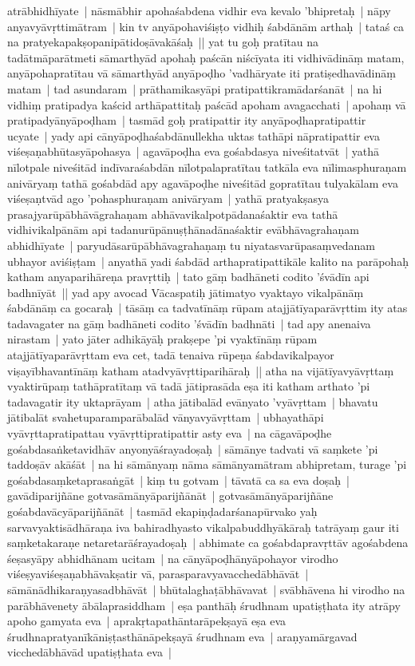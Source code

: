 \documentclass[article,12pt,a4paper]{memoir}%
\begin{document}
	  
	  \pstart \leavevmode%
	\label{thakur75-59.4}atrābhidhīyate | nāsmābhir apohaśabdena vidhir eva kevalo 'bhipretaḥ | nāpy anyavyāvṛttimātram | kin tv anyāpohaviśiṣṭo vidhiḥ śabdānām arthaḥ | tataś ca na pratyekapakṣopanipātidoṣāvakāśaḥ || \label{thakur75-59.7} yat tu goḥ pratītau na tadātmāparātmeti sāmarthyād apohaḥ paścān niścīyata iti vidhivādināṃ matam, anyāpohapratītau vā sāmarthyād anyāpoḍho 'vadhāryate iti pratiṣedhavādināṃ matam | tad asundaram | prāthamikasyāpi pratipattikramādarśanāt | na hi vidhiṃ pratipadya kaścid arthāpattitaḥ paścād apoham avagacchati | apohaṃ vā pratipadyānyāpoḍham | tasmād goḥ pratipattir ity anyāpoḍhapratipattir ucyate | yady api cānyāpoḍhaśabdānullekha uktas tathāpi nāpratipattir eva viśeṣaṇabhūtasyāpohasya | agavāpoḍha eva gośabdasya niveśitatvāt | yathā nīlotpale niveśitād indīvaraśabdān nīlotpalapratītau tatkāla eva nīlimasphuraṇam anivāryaṃ tathā gośabdād apy agavāpoḍhe niveśitād gopratītau tulyakālam eva viśeṣaṇtvād ago 'pohasphuraṇam anivāryam | yathā pratyakṣasya prasajyarūpābhāvāgrahaṇam abhāvavikalpotpādanaśaktir eva tathā vidhivikalpānām api tadanurūpānuṣṭhānadānaśaktir evābhāvagrahaṇam abhidhīyate | paryudāsarūpābhāvagrahaṇaṃ tu niyatasvarūpasaṃvedanam ubhayor aviśiṣṭam | anyathā yadi śabdād arthapratipattikāle kalito na parāpohaḥ katham anyaparihāreṇa pravṛttiḥ | tato gāṃ badhāneti codito 'śvādīn api badhnīyāt || \label{thakur75-59.21} yad apy avocad Vācaspatiḥ jātimatyo vyaktayo vikalpānāṃ śabdānāṃ ca gocaraḥ | tāsāṃ ca tadvatīnāṃ rūpam atajjātīyaparāvṛttim ity atas tadavagater na gāṃ badhāneti codito 'śvādīn badhnāti | tad apy anenaiva nirastam | yato jāter adhikāyāḥ prakṣepe 'pi vyaktīnāṃ rūpam atajjātīyaparāvṛttam eva cet, tadā tenaiva rūpeṇa śabdavikalpayor viṣayībhavantīnāṃ katham atadvyāvṛttiparihāraḥ || \label{thakur75-59.26} atha na vijātīyavyāvṛttaṃ vyaktirūpaṃ tathāpratītaṃ vā tadā jātiprasāda eṣa iti katham arthato 'pi tadavagatir ity uktaprāyam | \label{thakur75-59.28} atha jātibalād evānyato 'vyāvṛttam | bhavatu jātibalāt svahetuparamparābalād vānyavyāvṛttam | ubhayathāpi vyāvṛttapratipattau vyāvṛttipratipattir asty eva | \label{thakur75-60.1} na cāgavāpoḍhe gośabdasaṅketavidhāv anyonyāśrayadoṣaḥ | sāmānye tadvati vā saṃkete 'pi taddoṣāv akāśāt | na hi sāmānyaṃ nāma sāmānyamātram abhipretam, turage 'pi gośabdasaṃketaprasaṅgāt | kiṃ tu gotvam | tāvatā ca sa eva doṣaḥ | gavādiparijñāne gotvasāmānyāparijñānāt | gotvasāmānyāparijñāne gośabdavācyāparijñānāt | \label{thakur75-60.6} tasmād ekapiṇḍadarśanapūrvako yaḥ sarvavyaktisādhāraṇa iva bahiradhyasto vikalpabuddhyākāraḥ tatrāyaṃ gaur iti saṃketakaraṇe netaretarāśrayadoṣaḥ | \label{thakur75-60.8} abhimate ca gośabdapravṛttāv agośabdena śeṣasyāpy abhidhānam ucitam | na cānyāpoḍhānyāpohayor virodho viśeṣyaviśeṣaṇabhāvakṣatir vā, parasparavyavacchedābhāvāt | sāmānādhikaraṇyasadbhāvāt | bhūtalaghaṭābhāvavat | svābhāvena hi virodho na parābhāvenety ābālaprasiddham | eṣa panthāḥ śrudhnam upatiṣṭhata ity atrāpy apoho gamyata eva | aprakṛtapathāntarāpekṣayā eṣa eva śrudhnapratyanīkāniṣṭasthānāpekṣayā śrudhnam eva | araṇyamārgavad vicchedābhāvād upatiṣṭhata eva | 
\end{document}
